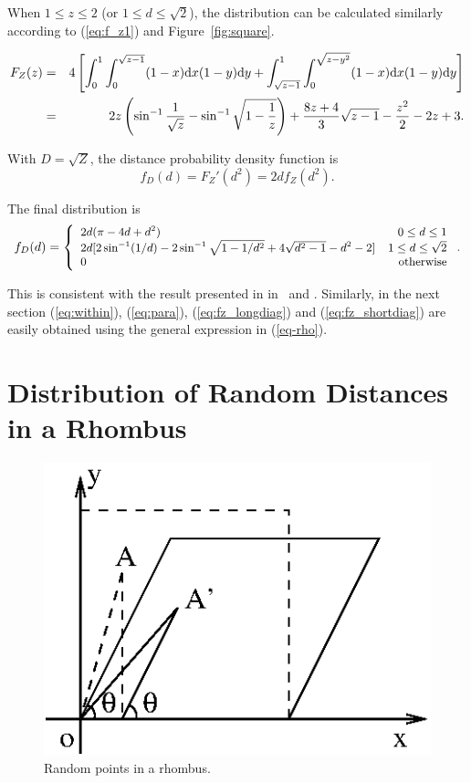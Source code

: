 \documentclass[12pt,draftclsnofoot,onecolumn]{IEEEtran}
\begin{document}
When $1\leq z\leq 2$ (or $1\leq d\leq\sqrt{2}$), the distribution can be calculated 
similarly according to (\ref{eq:f_z1}) and Figure~\ref{fig:square}. 
\begin{small}
\begin{eqnarray}
F_Z(z)&=&4\left[\int_{0}^{1}\int_{0}^{\sqrt{z-1}}(1-x){\rm d}x(1-y){\rm
d}y+\int_{\sqrt{z-1}}^1\int_{0}^{\sqrt{z-y^2}}(1-x){\rm d}x(1-y){\rm d}y\right] \nonumber\\
&=&2z\left(\sin^{-1}\frac{1}{\sqrt{z}}-\sin^{-1}\sqrt{1-\frac{1}{z}}\right)+\frac{8z+4}{3}\sqrt{z-1}
-\frac{z^2}{2}-2z+3.\nonumber
\end{eqnarray}
\end{small}

With $D=\sqrt{Z}$, the distance probability density function is
\begin{equation}\label{eq:fd-fz}
f_D(d)=F_Z'(d^2)=2df_Z(d^2).
\end{equation}

The final distribution is 
\begin{equation}\small
  f_{D}(d)=\left\{
    \begin{array}{lr}
      2d(\pi-4d+d^2) & 0\leq d\leq 1\\
      2d[2\sin^{-1}(1/d)-2\sin^{-1}\sqrt{1-1/d^2}+4\sqrt{d^2-1}-d^2-2] & 1\leq d\leq \sqrt{2} \\
      0 & {\rm otherwise} \nonumber
    \end{array}
  \right..
\end{equation}

This is consistent with the result presented in in~\cite{ghosh1943distribution} and 
\cite{ghosh1943random}.
Similarly, in the next section (\ref{eq:within}), (\ref{eq:para}), (\ref{eq:fz_longdiag}) and
(\ref{eq:fz_shortdiag}) are easily obtained using the general expression in (\ref{eq-rho}).


\section{Distribution of Random Distances in a Rhombus}\label{sec-withinr}

\begin{figure}
  \centering
  \includegraphics[width=0.4\columnwidth]{fig/single_rhombus}
  \caption{Random points in a rhombus.}
  \label{fig:rhombus}
\end{figure}
\end{document}
